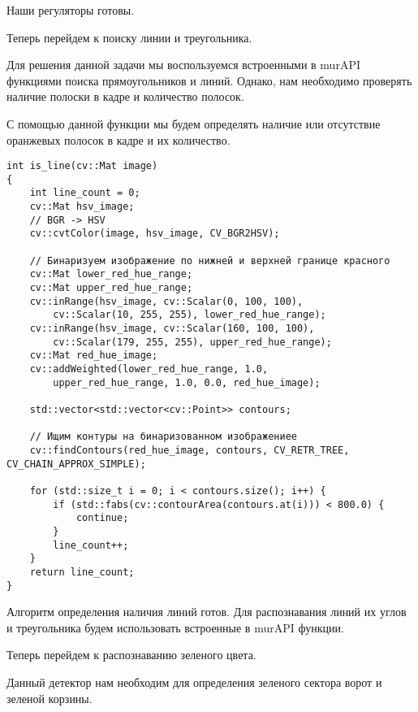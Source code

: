 Наши регуляторы готовы. 

Теперь перейдем к поиску линии и треугольника. 

Для решения данной задачи мы воспользуемся встроенными в murAPI функциями поиска прямоугольников и линий. Однако, нам необходимо проверять наличие полоски в кадре и количество полосок. 

С помощью данной функции мы будем определять наличие или отсутствие оранжевых полосок в кадре и их количество.

\begin{verbatim}
int is_line(cv::Mat image)
{
    int line_count = 0;
    cv::Mat hsv_image;
    // BGR -> HSV
    cv::cvtColor(image, hsv_image, CV_BGR2HSV);

    // Бинаризуем изображение по нижней и верхней границе красного
    cv::Mat lower_red_hue_range;
    cv::Mat upper_red_hue_range;
    cv::inRange(hsv_image, cv::Scalar(0, 100, 100), 
        cv::Scalar(10, 255, 255), lower_red_hue_range);
    cv::inRange(hsv_image, cv::Scalar(160, 100, 100), 
        cv::Scalar(179, 255, 255), upper_red_hue_range);
    cv::Mat red_hue_image;
    cv::addWeighted(lower_red_hue_range, 1.0, 
        upper_red_hue_range, 1.0, 0.0, red_hue_image);

    std::vector<std::vector<cv::Point>> contours;

    // Ищим контуры на бинаризованном изображениее
    cv::findContours(red_hue_image, contours, CV_RETR_TREE, CV_CHAIN_APPROX_SIMPLE);

    for (std::size_t i = 0; i < contours.size(); i++) {
        if (std::fabs(cv::contourArea(contours.at(i))) < 800.0) {
            continue;
        }
        line_count++;
    }
    return line_count;
}
\end{verbatim}

Алгоритм определения наличия линий готов. Для распознавания линий их углов и треугольника будем использовать встроенные в murAPI функции. 

Теперь перейдем к распознаванию зеленого цвета.

Данный детектор нам необходим для определения зеленого сектора ворот и зеленой корзины.

